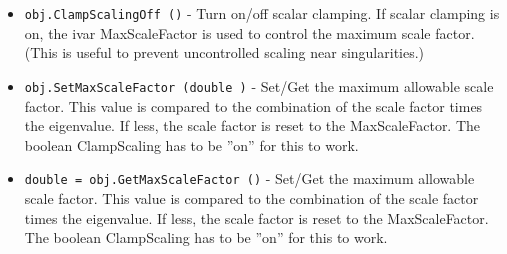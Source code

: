 \begin{itemize}
\item  \verb|obj.ClampScalingOff ()| -  Turn on/off scalar clamping. If scalar clamping is on, the ivar
 MaxScaleFactor is used to control the maximum scale factor. (This is
 useful to prevent uncontrolled scaling near singularities.)

\item  \verb|obj.SetMaxScaleFactor (double )| -  Set/Get the maximum allowable scale factor. This value is compared to the
 combination of the scale factor times the eigenvalue. If less, the scale
 factor is reset to the MaxScaleFactor. The boolean ClampScaling has to 
 be ''on'' for this to work.

\item  \verb|double = obj.GetMaxScaleFactor ()| -  Set/Get the maximum allowable scale factor. This value is compared to the
 combination of the scale factor times the eigenvalue. If less, the scale
 factor is reset to the MaxScaleFactor. The boolean ClampScaling has to 
 be ''on'' for this to work.

\end{itemize}

